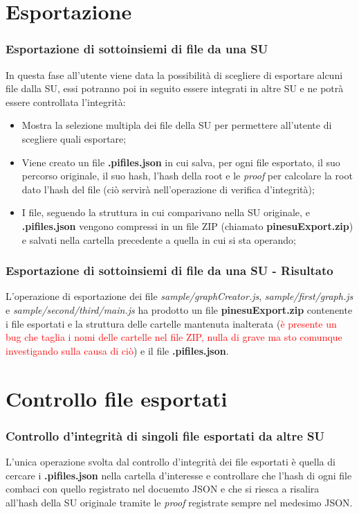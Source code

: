 \documentclass{beamer}
\begin{document}
\section{Esportazione}
\begin{frame}
	\frametitle{Esportazione di sottoinsiemi di file da una SU}
	In questa fase all'utente viene data la possibilità di scegliere di esportare alcuni file dalla SU, essi potranno poi in seguito essere integrati in altre SU e ne potrà essere controllata l'integrità:
	\begin{itemize}
		\item Mostra la selezione multipla dei file della SU per permettere all'utente di scegliere quali esportare;
		\item Viene creato un file \textbf{.pifiles.json} in cui salva, per ogni file esportato, il suo percorso originale, il suo hash, l'hash della root e le \emph{proof} per calcolare la root dato l'hash del file (ciò servirà nell'operazione di verifica d'integrità);
		\item I file, seguendo la struttura in cui comparivano nella SU originale, e \textbf{.pifiles.json} vengono compressi in un file ZIP (chiamato \textbf{pinesuExport.zip}) e salvati nella cartella precedente a quella in cui si sta operando;
	\end{itemize}
\end{frame}
\begin{frame}
	\frametitle{Esportazione di sottoinsiemi di file da una SU - Risultato}
	L'operazione di esportazione dei file \emph{sample/graphCreator.js}, \emph{sample/first/graph.js} e \emph{sample/second/third/main.js} ha prodotto un file \textbf{pinesuExport.zip} contenente i file esportati e la struttura delle cartelle mantenuta inalterata (\textcolor{red}{è presente un bug che taglia i nomi delle cartelle nel file ZIP, nulla di grave ma sto comunque investigando sulla causa di ciò}) e il file \textbf{.pifiles.json}.
\end{frame}
\section{Controllo file esportati}
\begin{frame}
	\frametitle{Controllo d'integrità di singoli file esportati da altre SU}
	L'unica operazione svolta dal controllo d'integrità dei file esportati è quella di cercare i \textbf{.pifiles.json} nella cartella d'interesse e controllare che l'hash di ogni file combaci con quello registrato nel docuemto JSON e che si riesca a risalira all'hash della SU originale tramite le \emph{proof} registrate sempre nel medesimo JSON. 
\end{frame}
\end{document}
